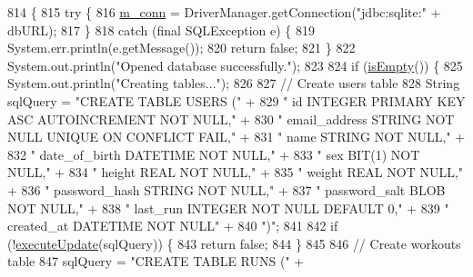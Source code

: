 \begin{DoxyCode}
814                                      \{
815         \textcolor{keywordflow}{try} \{
816             \mbox{\hyperlink{classcom_1_1activitytracker_1_1_d_b_manager_a064088d13ac09eb147fdc19268771521}{m\_conn}} = DriverManager.getConnection(\textcolor{stringliteral}{"jdbc:sqlite:"} + dbURL);
817         \}
818         \textcolor{keywordflow}{catch} (\textcolor{keyword}{final} SQLException e) \{
819             System.err.println(e.getMessage());
820             \textcolor{keywordflow}{return} \textcolor{keyword}{false};
821         \}
822         System.out.println(\textcolor{stringliteral}{"Opened database successfully."});
823 
824         \textcolor{keywordflow}{if} (\mbox{\hyperlink{classcom_1_1activitytracker_1_1_d_b_manager_af9ab112f840e3c803b6b28a2f1a15215}{isEmpty}}()) \{
825             System.out.println(\textcolor{stringliteral}{"Creating tables..."});
826 
827             \textcolor{comment}{// Create users table}
828             String sqlQuery = \textcolor{stringliteral}{"CREATE TABLE USERS ("} +
829                     \textcolor{stringliteral}{"    id            INTEGER PRIMARY KEY ASC AUTOINCREMENT NOT NULL,"} +
830                     \textcolor{stringliteral}{"    email\_address STRING  NOT NULL UNIQUE ON CONFLICT FAIL,"} +
831                     \textcolor{stringliteral}{"    name          STRING  NOT NULL,"} +
832                     \textcolor{stringliteral}{"    date\_of\_birth DATETIME    NOT NULL,"} +
833                     \textcolor{stringliteral}{"    sex           BIT(1)  NOT NULL,"} +
834                     \textcolor{stringliteral}{"    height        REAL    NOT NULL,"} +
835                     \textcolor{stringliteral}{"    weight        REAL    NOT NULL,"} +
836                     \textcolor{stringliteral}{"    password\_hash STRING  NOT NULL,"} +
837                     \textcolor{stringliteral}{"    password\_salt BLOB    NOT NULL,"} +
838                     \textcolor{stringliteral}{"    last\_run      INTEGER NOT NULL DEFAULT 0,"} +
839                     \textcolor{stringliteral}{"    created\_at    DATETIME    NOT NULL"} +
840                     \textcolor{stringliteral}{")"};
841 
842             \textcolor{keywordflow}{if} (!\mbox{\hyperlink{classcom_1_1activitytracker_1_1_d_b_manager_a382397e2bdf309901d1c80ff66be69b7}{executeUpdate}}(sqlQuery)) \{
843                 \textcolor{keywordflow}{return} \textcolor{keyword}{false};
844             \}
845 
846             \textcolor{comment}{// Create workouts table}
847             sqlQuery = \textcolor{stringliteral}{"CREATE TABLE RUNS ("} +

\end{DoxyCode}
